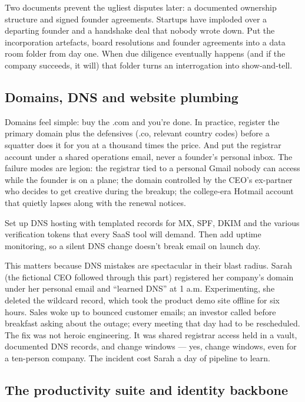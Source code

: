 Two documents prevent the ugliest disputes later: a documented ownership structure and signed founder agreements. Startups have imploded over a departing founder and a handshake deal that nobody wrote down. Put the incorporation artefacts, board resolutions and founder agreements into a data room folder from day one. When due diligence eventually happens (and if the company succeeds, it will) that folder turns an interrogation into show-and-tell.



\subsection{Domains, DNS and website plumbing}


Domains feel simple: buy the .com and you're done. In practice, register the primary domain plus the defensives (.co, relevant country codes) before a squatter does it for you at a thousand times the price. And put the registrar account under a shared operations email, never a founder's personal inbox. The failure modes are legion: the registrar tied to a personal Gmail nobody can access while the founder is on a plane; the domain controlled by the CEO's ex-partner who decides to get creative during the breakup; the college-era Hotmail account that quietly lapses along with the renewal notices.


Set up DNS hosting with templated records for MX, SPF, DKIM and the various verification tokens that every SaaS tool will demand. Then add uptime monitoring, so a silent DNS change doesn't break email on launch day.


This matters because DNS mistakes are spectacular in their blast radius. Sarah (the fictional CEO followed through this part) registered her company's domain under her personal email and ``learned DNS'' at 1 a.m. Experimenting, she deleted the wildcard record, which took the product demo site offline for six hours. Sales woke up to bounced customer emails; an investor called before breakfast asking about the outage; every meeting that day had to be rescheduled. The fix was not heroic engineering. It was shared registrar access held in a vault, documented DNS records, and change windows — yes, change windows, even for a ten-person company. The incident cost Sarah a day of pipeline to learn.



\subsection{The productivity suite and identity backbone}


